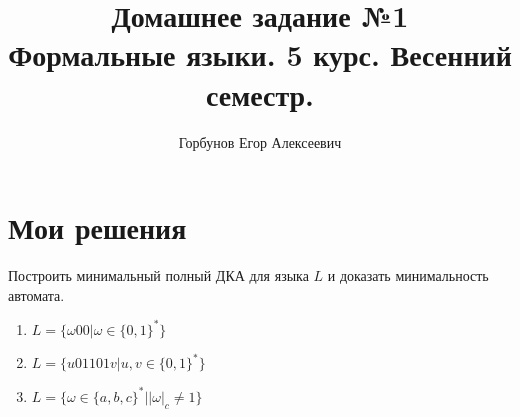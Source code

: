 
\title{Домашнее задание №1 \\ Формальные языки. 5 курс. Весенний семестр.}
\author{Горбунов Егор Алексеевич}


\maketitle

\section{Мои решения}
\begin{task}[1]
	Построить минимальный полный ДКА для языка $L$ и доказать минимальность автомата.
	\begin{enumerate}[label = (\alph*)]
		\item $L = \lbrace \omega 0 0 | \omega \in \lbrace 0, 1 \rbrace^* \rbrace$
		\item $L = \lbrace u01101v | u,v \in \lbrace 0, 1 \rbrace^* \rbrace$
		\item $L = \lbrace \omega \in \lbrace a,b,c \rbrace^* | |\omega|_c \neq 1 \rbrace$
	\end{enumerate}
\end{task}
